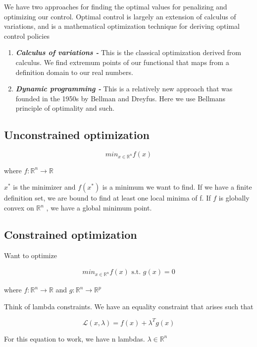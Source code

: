 \documentclass[11pt, a4paper]{article} %
\begin{document}
We have two approaches for finding the optimal values for penalizing and optimizing our control. Optimal control is largely an extension of calculus of variations, and is a mathematical optimization technique for deriving optimal control policies

\begin{enumerate}
    \item \textbf{\textit{Calculus of variations - }} This is the classical optimization derived from calculus. We find extremum points of our functional that maps from a definition domain to our real numbers.
    \item \textbf{\textit{Dynamic programming - }}This is a relatively new approach that was founded in the 1950s by Bellman and Dreyfus. Here we use Bellmans principle of optimality and such.
\end{enumerate}




\subsection{Unconstrained optimization}

\[
    min_{x\in \mathbb{R}^n} f(x)
\]

where $ f: \mathbb{R}^n \rightarrow \mathbb{R} $

$ x^* $ is the minimizer and $ f(x^*) $ is a minimum we want to find. If we have a finite definition set, we are bound to find at least one local minima of f. If $ f$ is globally convex on $ \mathbb{R}^n $ , we have a global minimum point.   


\subsection{Constrained optimization}

Want to optimize 

\begin{align*}
    min_{x\in \mathbb{R}^n} f(x) \text{ s.t. } g(x) =0
\end{align*}

where $ f:\mathbb{R}^n \rightarrow \mathbb{R} $ and $ g: \mathbb{R}^n \rightarrow \mathbb{R}^p$ 

Think of lambda constraints. We have an equality constraint that arises such that

\[
    \mathcal{L}(x, \lambda) =  f(x) + \lambda^T g(x)
\]

For this equation to work, we have n lambdas. $ \lambda \in \mathbb{R}^n $ 
\end{document}
